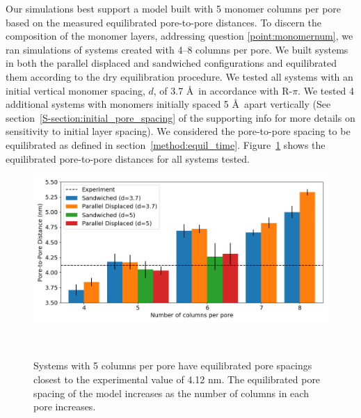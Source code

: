 \documentclass[journal=jpcbfk,manuscript=article]{achemso}
\begin{document}
  Our simulations best support a model built with 5 monomer columns per pore based on
  the measured equilibrated pore-to-pore distances. To discern the composition of
  the monomer layers, addressing question \ref{point:monomernum}, we ran
  simulations of systems created with 4--8 columns per pore. We built systems in both
  the parallel displaced and sandwiched configurations and equilibrated them according
  to the dry equilibration procedure. We tested all systems with an initial vertical monomer 
  spacing, $\mathit{d}$, of 3.7 \AA~in accordance with R-$\pi$. We tested 4 additional 
  systems with monomers initially spaced 5 \AA~apart vertically (See section~\ref{S-section:initial_pore_spacing}
  of the supporting info for more details on sensitivity to initial layer spacing). 
  We considered the pore-to-pore spacing to be equilibrated as defined in section~\ref{method:equil_time}.
  Figure~\ref{fig:p2p} shows the equilibrated pore-to-pore distances for all systems tested. 
  
  \begin{figure}[!htb]
	\centering
	\includegraphics[width=\linewidth]{p2p.png}
	\caption{Systems with 5 columns per pore have equilibrated pore spacings closest to
			 the experimental value of 4.12 nm. The equilibrated pore spacing of the model 	
			 increases as the number of columns in each pore increases.}~\label{fig:p2p}
  \end{figure}  
  
\end{document}
